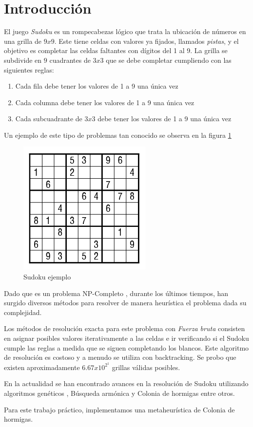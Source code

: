 \section{Introducción}
\label{sec:intro}

El juego \emph{Sudoku} es un rompecabezas lógico que trata la ubicación de
números en una grilla de $9 x 9$. Este tiene celdas con valores ya fijados,
llamados \textit{pistas}, y el objetivo es completar las celdas
faltantes con dígitos del 1 al 9. La grilla se subdivide en $9$ cuadrantes de
$3 x 3$  que se debe completar cumpliendo con las siguientes reglas:

\begin{enumerate}
    \label{enum:principios}

    \item Cada fila debe tener los valores de 1 a 9 una única vez
    \item Cada columna debe tener los valores de 1 a 9 una única vez
    \item Cada subcuadrante de $3x3$ debe tener los valores de 1 a 9 una única vez
\end{enumerate}

Un ejemplo de este tipo de problemas tan conocido se observa en la figura \ref{img:sudoku}


\begin{figure}[H]
	\centering
	\includegraphics[scale=0.6]{./img/sudoku_ejemplo.png}
	\caption{Sudoku ejemplo}
	\label{img:sudoku}
\end{figure}


Dado que es un problema NP-Completo \cite{complexity}, durante los últimos tiempos, han surgido
diversos métodos para resolver de manera heurística el problema dada su complejidad.

Los métodos de resolución exacta para este problema con \emph{Fuerza bruta}
consisten en asignar posibles valores iterativamente a las celdas e ir
verificando si el Sudoku cumple las reglas a medida que se siguen completando
los blancos. Este algoritmo de resolución es costoso y a menudo se utiliza con backtracking. 
Se probo que existen aproximadamente $6.67 x 10^2^1$ grillas válidas posibles. 

En la actualidad se han encontrado avances en la resolución de Sudoku utilizando
algoritmos genéticos \cite{genetic}, Búsqueda armónica
\cite{harmony} y Colonia de hormigas \cite{ant_colony_1} entre otros.

Para este trabajo práctico, implementamos una metaheurística de Colonia de hormigas.

